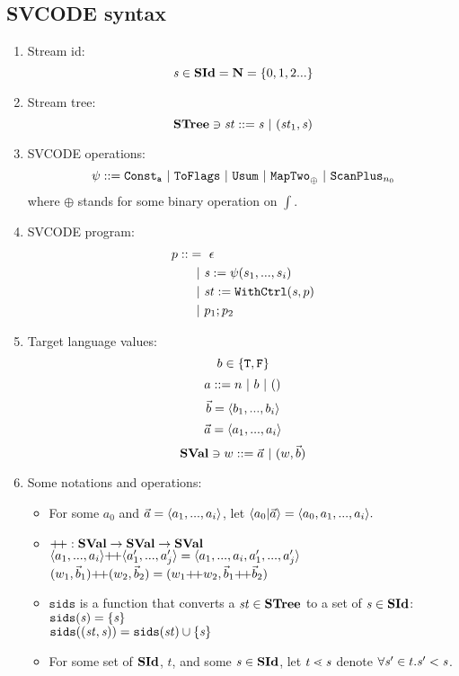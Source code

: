 \subsection{SVCODE syntax}
\begin{enumerate}[(1)]
\item Stream id: $$\mathit{s} \in \mathbf{SId} = \mathbf{N} = \{0,1,2...\}$$

\item Stream tree: $$ \STree \ni \st ::= \s \ | \ (\st_1,\s) $$
\item SVCODE operations: $$\psi ::= \mathtt{Const_{a}} \ | \ \mathtt{ToFlags}
\ | \ \mathtt{Usum} \ | \ \mathtt{MapTwo}_{\oplus} \ | \ \mathtt{ScanPlus}_{n_0} $$
where $\oplus$ stands for some binary operation on $\int$. \\


\item SVCODE program: 
\begin{align*}
	p :: & = \ \epsilon \\
	     &\ \ | \ \mathit{s} := \psi(s_1,...,s_i) \\
	     &\ \ | \ \mathit{st} := \mathtt{WithCtrl}(\mathit{s},p) \\
	     &\ \ | \ p_1;p_2 	 
\end{align*}


\item Target language values: 
$$b \in \{\mathtt{T},\mathtt{F} \}$$
$$ a ::= n \ | \ b \ | \ \unit$$
$$\vec b = \langle b_1,...,b_i \rangle$$ 
$$\vec a = \langle a_1,...,a_i \rangle  $$
$$\mathbf{SVal} \ni w ::= \vec a \ | \ (w,\vec b) $$

\item Some notations and operations:
\begin{itemize}
	\item For some $a_0$ and $\a = \< a_1,...,a_i \'>$, let $\< a_0 | \a \'>  = \< a_0,a_1,...,a_i \'>. $ 

	\item $\++: \SVal \->  \SVal \-> \SVal$ \\
	  $\vapp{\vrange{a_1}{a_i}} {\vrange{a_1'}{a_j'}} = \langle a_1,...,a_i,a_1',...,a_j' \rangle $ \\
	  $\vapp{(\v_1,\b_1)}{(\v_2,\b_2)} = (\vapp{\v_1}{\v_2}, \vapp{\b_1}{\b_2})$

	\item $\texttt{sids}$ is a function that converts a $\mathit{st} \in \mathbf{STree}$ to a set of $\mathit{s} \in \mathbf{SId}$: \\
	$\mathtt{sids}(\mathit{s}) = \{\mathit{s}\}$ \\
	$\mathtt{sids}((\mathit{st},\mathit{s})) = \mathtt{sids}(\mathit{st}) \cup \{\mathit{s}\}$ 
   
    \item 
    For some set of $\mathbf{SId}$, $t$, and some $\mathit{s} \in \mathbf{SId}$, let $t \.< \s$ denote $\forall \mathit{s}' \in t. \mathit{s}' < \mathit{s}$.

\end{itemize}

\end{enumerate}

